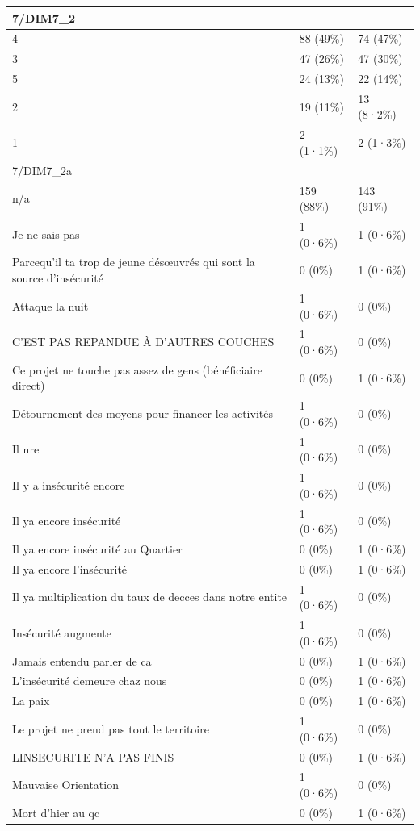 \documentclass[
]{book}
\begin{document}
\begin{tabular}{l|l|l}
\hline
7/DIM7\_2 &  & \\
\hline
4 & 88 (49\%) & 74 (47\%)\\
\hline
3 & 47 (26\%) & 47 (30\%)\\
\hline
5 & 24 (13\%) & 22 (14\%)\\
\hline
2 & 19 (11\%) & 13 (8·2\%)\\
\hline
1 & 2 (1·1\%) & 2 (1·3\%)\\
\hline
7/DIM7\_2a &  & \\
\hline
n/a & 159 (88\%) & 143 (91\%)\\
\hline
Je ne sais pas & 1 (0·6\%) & 1 (0·6\%)\\
\hline
Parcequ'il ta trop de jeune désœuvrés qui sont la source d'insécurité & 0 (0\%) & 1 (0·6\%)\\
\hline
Attaque la nuit & 1 (0·6\%) & 0 (0\%)\\
\hline
C'EST PAS REPANDUE À D'AUTRES COUCHES & 1 (0·6\%) & 0 (0\%)\\
\hline
Ce projet ne touche pas assez de gens (bénéficiaire direct) & 0 (0\%) & 1 (0·6\%)\\
\hline
Détournement des moyens pour financer les activités & 1 (0·6\%) & 0 (0\%)\\
\hline
Il nre & 1 (0·6\%) & 0 (0\%)\\
\hline
Il y a insécurité encore & 1 (0·6\%) & 0 (0\%)\\
\hline
Il ya encore insécurité & 1 (0·6\%) & 0 (0\%)\\
\hline
Il ya encore insécurité au Quartier & 0 (0\%) & 1 (0·6\%)\\
\hline
Il ya encore l'insécurité & 0 (0\%) & 1 (0·6\%)\\
\hline
Il ya multiplication du taux de decces dans notre entite & 1 (0·6\%) & 0 (0\%)\\
\hline
Insécurité augmente & 1 (0·6\%) & 0 (0\%)\\
\hline
Jamais entendu parler de ca & 0 (0\%) & 1 (0·6\%)\\
\hline
L'insécurité demeure chaz nous & 0 (0\%) & 1 (0·6\%)\\
\hline
La paix & 0 (0\%) & 1 (0·6\%)\\
\hline
Le projet ne prend pas tout le territoire & 1 (0·6\%) & 0 (0\%)\\
\hline
LINSECURITE N'A PAS FINIS & 0 (0\%) & 1 (0·6\%)\\
\hline
Mauvaise Orientation & 1 (0·6\%) & 0 (0\%)\\
\hline
Mort d'hier au qc & 0 (0\%) & 1 (0·6\%)\\

\end{tabular}
\end{document}
